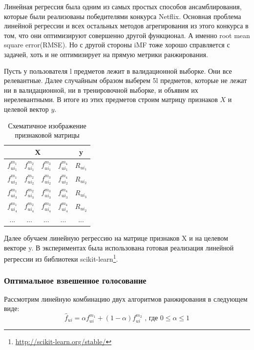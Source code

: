 \documentclass[14pt]{extarticle}
\begin{document}
Линейная регрессия была одним из самых простых способов ансамблирования, которые были реализованы победителями конкурса Netflix.  Основная  проблема линейной регрессии и всех остальных методов агрегирования из этого конкурса в том, что они оптимизируют совершенно другой функционал. А именно root mean square error(RMSE). Но с другой стороны iMF тоже хорошо справляется с  задачей, хоть и не оптимизирует на прямую метрики ранжирования.

Пусть у пользователя l предметов лежит в валидационной выборке. Они все релевантные. Далее случайным образом выберем 5l предметов, которые не лежат ни в валидационной, ни в тренировочной выборке, и объявим их нерелевантными. В итоге из этих предметов строим матрицу признаков $X$ и целевой вектор $y$. 

\begin{table}[H]
\label{tab:schemetable}
\begin{center}
\begin{tabular}{|c|c|c|c|c|}
\hline
 \multicolumn{4}{|c|}{X} & \multicolumn{1}{|c|}{y}\\
\hline
  $f_{ui_1} ^ {m_1}$& $f_{ui_1} ^ {m_2}$ & $f_{ui_1} ^ {m_3}$& $f_{ui_1} ^ {m_4}$& $R_{ui_1}$ \\
\hline
$f_{ui_2} ^ {m_1}$& $f_{ui_2} ^ {m_2}$ & $f_{ui_2} ^ {m_3}$& $f_{ui_2} ^ {m_4}$& $R_{ui_2}$ \\
\hline
$f_{ui_3} ^ {m_1}$& $f_{ui_3} ^ {m_2}$ & $f_{ui_3} ^ {m_3}$& $f_{ui_3} ^ {m_4}$& $R_{ui_3}$ \\
\hline
$f_{ui_4} ^ {m_1}$& $f_{ui_4} ^ {m_2}$ & $f_{ui_4} ^ {m_3}$& $f_{ui_4} ^ {m_4}$& $R_{ui_2}$ \\
\hline
... & ... & ... &  ... & ... \\
\end{tabular}
\end{center}
\caption{Схематичное изображение признаковой матрицы}
\end{table} 

Далее обучаем  линейную регрессию на матрице признаков X и на целевом векторе y. В экспериментах была использована готовая реализация линейной регрессии из библиотеки scikit-learn\footnote{\url{http://scikit-learn.org/stable/}}.

\subsubsection*{Оптимальное взвешенное голосование} 
      Рассмотрим линейную комбинацию двух алгоритмов ранжирования  в следующем виде:
\begin{equation*}
	\hat{f}_{ui} = \alpha f_{ui}^{m_1} + (1 - \alpha) f_{ui} ^ {m_2} \textrm{\ , где $0 \leq \alpha \leq 1$} 
\end{equation*}
\end{document}
